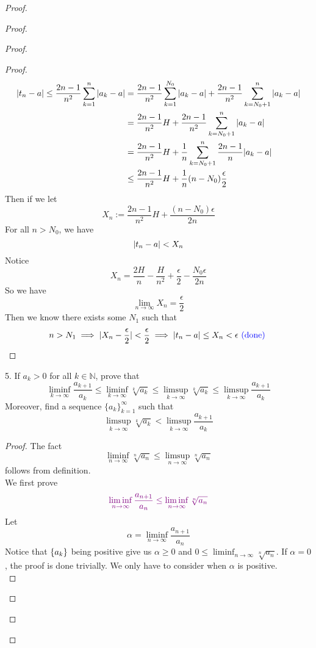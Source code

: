 \documentclass{report}
\begin{document}
\begin{proof}
\begin{proof}
\begin{proof}
\begin{proof}
\begin{align}
  |t_n-a|\leq \frac{2n-1}{n^2}\sum_{k=1}^n |a_k-a|&=\frac{2n-1}{n^2}\sum_{k=1}^{N_0}|a_k-a|+\frac{2n-1}{n^2}\sum_{k=N_0+1}^n |a_k-a|\\
&=\frac{2n-1}{n^2}H+\frac{2n-1}{n^2}\sum_{k=N_0+1}^n |a_k-a|\\
&= \frac{2n-1}{n^2}H+\frac{1}{n}\sum_{k=N_0+1}^n \frac{2n-1}{n}|a_k-a|\\
&\leq  \frac{2n-1}{n^2}H+ \frac{1}{n}(n-N_0) \frac{\epsilon }{2} 
\end{align}
Then if we let 
\begin{equation}
X_n:=\frac{2n-1}{n^2}H+\frac{(n-N_0)\epsilon }{2n}
\end{equation}
For all $n>N_0$, we have
 \begin{equation}
|t_n-a|<X_n
\end{equation}
Notice 
\begin{equation}
X_n=\frac{2H}{n}-\frac{H}{n^2}+\frac{\epsilon}{2}-\frac{N_0\epsilon }{2n}
\end{equation}
So we have
\begin{equation}
\lim_{n\to\infty}X_n=\frac{\epsilon}{2}
\end{equation}
Then we know there exists some $N_1$ such that 
 \begin{equation}
   n>N_1\implies |X_n-\frac{\epsilon}{2}|<\frac{\epsilon}{2}\implies |t_n-a|\leq X_n<\epsilon \textcolor{blue}{\text{ (done) }}
\end{equation}


\end{proof}
\begin{question}{}{}
5. If $a_k > 0$ for all $k \in \mathbb{N}$, prove that
\[
  \liminf_{k\to\infty} \frac{a_{k+1}}{a_k} \leq \liminf_{k\to\infty} \sqrt[k]{a_k} \leq \limsup_{k\to\infty} \sqrt[k]{a_k} \leq \limsup_{k\to\infty} \frac{a_{k+1}}{a_k}
\]
Moreover, find a sequence $\{a_k\}_{k=1}^{\infty}$ such that 
\[
  \limsup_{k\to\infty} \sqrt[k]{a_k} < \limsup_{k\to\infty} \frac{a_{k+1}}{a_k}
\]
\end{question}

\begin{proof}
The fact 
\begin{equation}
\liminf_{n\to\infty} \sqrt[n]{a_n}\leq \limsup_{n\to\infty} \sqrt[n]{a_n}  
\end{equation}
follows from definition.\\

We first prove
\begin{equation}
  \textcolor{violet}{\liminf_{n\to\infty} \frac{a_{n+1}}{a_n}\leq \liminf_{n\to\infty} \sqrt[n]{a_n}}
\end{equation}
Let 
\begin{equation}
\alpha =\liminf_{n\to\infty} \frac{a_{n+1}}{a_n}
\end{equation}
Notice that $\{ a_k \}$ being positive give us $\alpha \geq 0$ and $0\leq \liminf_{n\to\infty} \sqrt[n]{a_n} $. If $\alpha =0$, the proof is done trivially. We only have to consider when $\alpha $ is positive.\\


\end{proof}
\end{proof}
\end{proof}
\end{proof}
\end{document}
